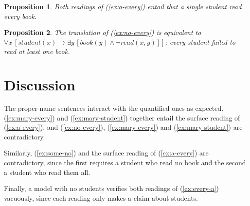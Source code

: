 \documentclass{article}
\newtheorem{proposition}{Proposition}
\begin{document}
\begin{proposition}\label{prop:both-2}
Both readings of (\ref{ex:a-every}) entail that a single student read every
book.
\end{proposition}

\begin{proposition}\label{prop:no-every}
The translation of (\ref{ex:no-every}) is equivalent to
$\forall x\,[\mathit{student}(x) \rightarrow \exists y\,[\mathit{book}(y) \wedge \neg\mathit{read}(x,y)]]$:
every student failed to read at least one book.
\end{proposition}

\section{Discussion}

The proper-name sentences interact with the quantified ones as expected.
(\ref{ex:mary-every}) and (\ref{ex:mary-student}) together entail the
surface reading of (\ref{ex:a-every}), and (\ref{ex:no-every}),
(\ref{ex:mary-every}) and (\ref{ex:mary-student}) are contradictory.

Similarly, (\ref{ex:some-no}) and the surface reading of (\ref{ex:a-every})
are contradictory, since the first requires a student who read no book and
the second a student who read them all.

Finally, a model with no students verifies both readings of
(\ref{ex:every-a}) vacuously, since each reading only makes a claim about
students.
\end{document}
